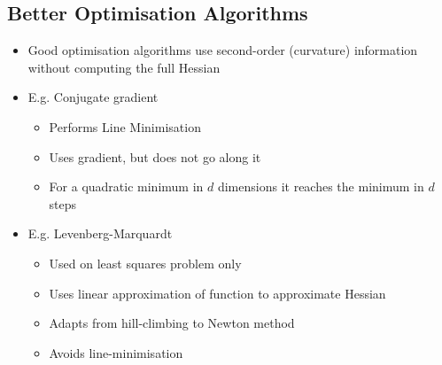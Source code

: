 \begin{slide}
\section[-1]{Better Optimisation Algorithms}

\begin{PauseHighLight}

\begin{itemize}
\item Good optimisation algorithms use second-order (curvature)
  information without computing the full Hessian\pause
\item E.g. Conjugate gradient\pause
  \begin{itemize}\squeeze
  \item Performs Line Minimisation\pause
  \item Uses gradient, but does not go along it\pause
  \item For a quadratic minimum in $d$ dimensions it reaches the
    minimum in $d$ steps\pause
  \end{itemize}
\item E.g. Levenberg-Marquardt\pause
  \begin{itemize}\squeeze
  \item Used on least squares problem only\pause
  \item Uses linear approximation of function to approximate Hessian\pause
  \item Adapts from hill-climbing to Newton method\pause
  \item Avoids line-minimisation\pause
  \end{itemize}
\end{itemize}

\end{PauseHighLight}
\end{slide}


